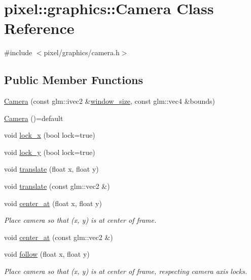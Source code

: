 \hypertarget{classpixel_1_1graphics_1_1_camera}{}\section{pixel\+:\+:graphics\+:\+:Camera Class Reference}
\label{classpixel_1_1graphics_1_1_camera}


{\ttfamily \#include $<$pixel/graphics/camera.\+h$>$}

\subsection*{Public Member Functions}
\begin{DoxyCompactItemize}
\item 
\hyperlink{classpixel_1_1graphics_1_1_camera_ab919425fc4978e0846a19a9ff446b621}{Camera} (const glm\+::ivec2 \&\hyperlink{classpixel_1_1graphics_1_1_camera_aa8bad1ecf68611262195b74f42151922}{window\+\_\+size}, const glm\+::vec4 \&bounds)
\item 
\hyperlink{classpixel_1_1graphics_1_1_camera_a0c6568dcfd5bf88473afdce0e37a8626}{Camera} ()=default
\item 
void \hyperlink{classpixel_1_1graphics_1_1_camera_a9dce6fdffb32d923fbcf0e843d907646}{lock\+\_\+x} (bool lock=true)
\item 
void \hyperlink{classpixel_1_1graphics_1_1_camera_a625c61d63849d8c3776002629c5b790c}{lock\+\_\+y} (bool lock=true)
\item 
void \hyperlink{classpixel_1_1graphics_1_1_camera_aff3960e6c58a8474096eb86b6e1a2b14}{translate} (float x, float y)
\item 
void \hyperlink{classpixel_1_1graphics_1_1_camera_aa3c02a27599eebb5d3b380f852bb86ec}{translate} (const glm\+::vec2 \&)
\item 
void \hyperlink{classpixel_1_1graphics_1_1_camera_a3f67a033a8b22e83c78ecfb2f9fc52a7}{center\+\_\+at} (float x, float y)
\begin{DoxyCompactList}\small\item\em Place camera so that (x, y) is at center of frame. \end{DoxyCompactList}\item 
void \hyperlink{classpixel_1_1graphics_1_1_camera_ac011c85f13b10176b023d9e02f73f1f7}{center\+\_\+at} (const glm\+::vec2 \&)
\item 
void \hyperlink{classpixel_1_1graphics_1_1_camera_a24e2aa28bbfbfb5c93f9d734e77ee375}{follow} (float x, float y)
\begin{DoxyCompactList}\small\item\em Place camera so that (x, y) is at center of frame, respecting camera axis locks. \end{DoxyCompactList}\item 

\end{DoxyCompactItemize}
